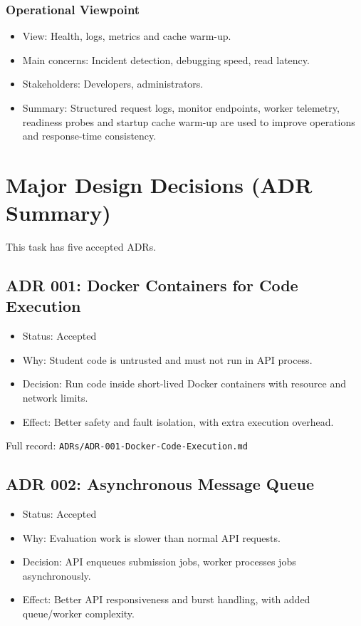 \documentclass[12pt,journal,onecolumn]{IEEEtran}
\begin{document}
\subsubsection{Operational Viewpoint}
\begin{itemize}
    \item View: Health, logs, metrics and cache warm-up.
    \item Main concerns: Incident detection, debugging speed, read latency.
    \item Stakeholders: Developers, administrators.
    \item Summary: Structured request logs, monitor endpoints, worker telemetry, readiness probes and startup cache warm-up are used to improve operations and response-time consistency.
\end{itemize}

\section{Major Design Decisions (ADR Summary)}

This task has five accepted ADRs.

\subsection{ADR 001: Docker Containers for Code Execution}
\begin{itemize}
    \item Status: Accepted
    \item Why: Student code is untrusted and must not run in API process.
    \item Decision: Run code inside short-lived Docker containers with resource and network limits.
    \item Effect: Better safety and fault isolation, with extra execution overhead.
\end{itemize}

Full record: \texttt{ADRs/ADR-001-Docker-Code-Execution.md}

\subsection{ADR 002: Asynchronous Message Queue}
\begin{itemize}
    \item Status: Accepted
    \item Why: Evaluation work is slower than normal API requests.
    \item Decision: API enqueues submission jobs, worker processes jobs asynchronously.
    \item Effect: Better API responsiveness and burst handling, with added queue/worker complexity.
\end{itemize}
\end{document}

